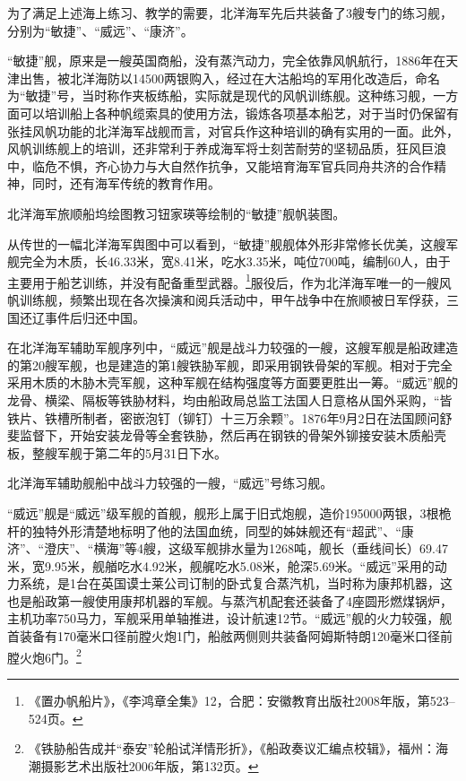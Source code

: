 \documentclass[12pt,UTF8]{ctexbook}
\begin{document}
为了满足上述海上练习、教学的需要，北洋海军先后共装备了3艘专门的练习舰，分别为“敏捷”、“威远”、“康济”。

“敏捷”舰，原来是一艘英国商船，没有蒸汽动力，完全依靠风帆航行，1886年在天津出售，被北洋海防以14500两银购入，经过在大沽船坞的军用化改造后，命名为“敏捷”号，当时称作夹板练船，实际就是现代的风帆训练舰。这种练习舰，一方面可以培训船上各种帆缆索具的使用方法，锻炼各项基本船艺，对于当时仍保留有张挂风帆功能的北洋海军战舰而言，对官兵作这种培训的确有实用的一面。此外，风帆训练舰上的培训，还非常利于养成海军将士刻苦耐劳的坚韧品质，狂风巨浪中，临危不惧，齐心协力与大自然作抗争，又能培育海军官兵同舟共济的合作精神，同时，还有海军传统的教育作用。

北洋海军旅顺船坞绘图教习钮家瑛等绘制的“敏捷”舰帆装图。

从传世的一幅北洋海军舆图中可以看到，“敏捷”舰舰体外形非常修长优美，这艘军舰完全为木质，长46.33米，宽8.41米，吃水3.35米，吨位700吨，编制60人，由于主要用于船艺训练，并没有配备重型武器。\footnote{《置办帆船片》，《李鸿章全集》12，合肥：安徽教育出版社2008年版，第523--524页。}服役后，作为北洋海军唯一的一艘风帆训练舰，频繁出现在各次操演和阅兵活动中，甲午战争中在旅顺被日军俘获，三国还辽事件后归还中国。

在北洋海军辅助军舰序列中，“威远”舰是战斗力较强的一艘，这艘军舰是船政建造的第20艘军舰，也是建造的第1艘铁胁军舰，即采用钢铁骨架的军舰。相对于完全采用木质的木胁木壳军舰，这种军舰在结构强度等方面要更胜出一筹。“威远”舰的龙骨、横梁、隔板等铁胁材料，均由船政局总监工法国人日意格从国外采购，“皆铁片、铁槽所制者，密嵌泡钉（铆钉）十三万余颗”。1876年9月2日在法国顾问舒斐监督下，开始安装龙骨等全套铁胁，然后再在钢铁的骨架外铆接安装木质船壳板，整艘军舰于第二年的5月31日下水。

北洋海军辅助舰船中战斗力较强的一艘，“威远”号练习舰。

“威远”舰是“威远”级军舰的首舰，舰形上属于旧式炮舰，造价195000两银，3根桅杆的独特外形清楚地标明了他的法国血统，同型的姊妹舰还有“超武”、“康济”、“澄庆”、“横海”等4艘，这级军舰排水量为1268吨，舰长（垂线间长）69.47米，宽9.95米，舰艏吃水4.92米，舰艉吃水5.08米，舱深5.69米。“威远”采用的动力系统，是1台在英国谟士莱公司订制的卧式复合蒸汽机，当时称为康邦机器，这也是船政第一艘使用康邦机器的军舰。与蒸汽机配套还装备了4座圆形燃煤锅炉，主机功率750马力，军舰采用单轴推进，设计航速12节。“威远”舰的火力较强，舰首装备有170毫米口径前膛火炮1门，船舷两侧则共装备阿姆斯特朗120毫米口径前膛火炮6门。\footnote{《铁胁船告成并“泰安”轮船试洋情形折》，《船政奏议汇编点校辑》，福州：海潮摄影艺术出版社2006年版，第132页。}
\end{document}
